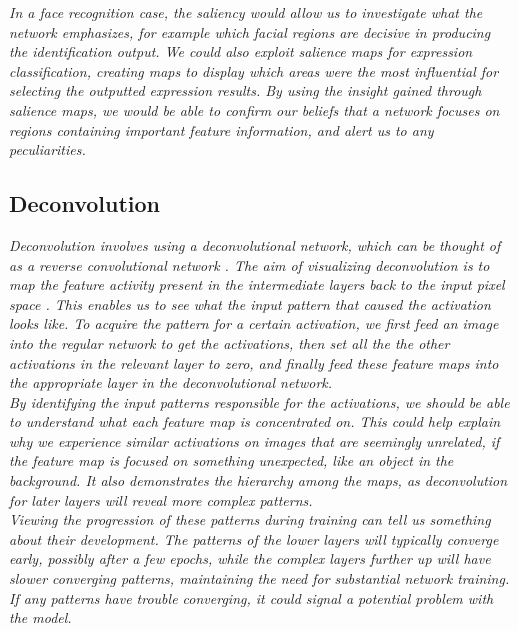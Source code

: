 \noindent \textit{In a face recognition case, the saliency would allow us to investigate what the network emphasizes, for example which facial regions are decisive in producing the identification output. We could also exploit salience maps for expression classification, creating maps to display which areas were the most influential for selecting the outputted expression results. By using the insight gained through salience maps, we would be able to confirm our beliefs that a network focuses on regions containing important feature information, and alert us to any peculiarities.}

\subsection{Deconvolution}

\textit{Deconvolution involves using a deconvolutional network, which can be thought of as a reverse convolutional network \cite{deconv_net}. The aim of visualizing deconvolution is to map the feature activity present in the intermediate layers back to the input pixel space \cite{deconv_vis}. This enables us to see what the input pattern that caused the activation looks like. To acquire the pattern for a certain activation, we first feed an image into the regular network to get the activations, then set all the the other activations in the relevant layer to zero, and finally feed these feature maps into the appropriate layer in the deconvolutional network.} \\

\noindent \textit{By identifying the input patterns responsible for the activations, we should be able to understand what each feature map is concentrated on. This could help explain why we experience similar activations on images that are seemingly unrelated, if the feature map is focused on something unexpected, like an object in the background. It also demonstrates the hierarchy among the maps, as deconvolution for later layers will reveal more complex patterns.} \\

\noindent \textit{Viewing the progression of these patterns during training can tell us something about their development. The patterns of the lower layers will typically converge early, possibly after a few epochs, while the complex layers further up will have slower converging patterns, maintaining the need for substantial network training. If any patterns have trouble converging, it could signal a potential problem with the model.}

